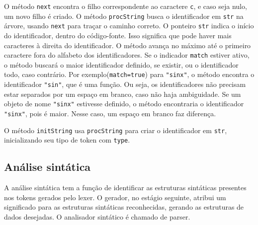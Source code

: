 O método \texttt{next} encontra o filho correspondente ao caractere \texttt{c},
e caso seja nulo, um novo filho é criado.
O método \texttt{procString} busca o identificador em \texttt{str} na árvore,
usando \texttt{next} para traçar o caminho correto.
O ponteiro \texttt{str} indica o início do identificador, dentro do código-fonte.
Isso significa que pode haver mais caracteres à direita do identificador.
O método avança no máximo até o primeiro caractere fora do alfabeto dos identificadores.
Se o indicador \texttt{match} estiver ativo, o método buscará o
maior identificador definido, se existir, ou o identificador todo, caso contrário.
Por exemplo(\texttt{match=true}) para \texttt{"sinx"},
o método encontra o identificador \texttt{"sin"}, que é uma função.
Ou seja, os identificadores não precisam estar separados por um espaço em branco,
caso não haja ambiguidade.
Se um objeto de nome \texttt{"sinx"} estivesse definido,
o método encontraria o identificador \texttt{"sinx"}, pois é maior.
Nesse caso, um espaço em branco faz diferença.

O método \texttt{initString} usa \texttt{procString}
para criar o identificador em \texttt{str},
inicializando seu tipo de token com \texttt{type}.

\subsection{Análise sintática}
A análise sintática tem a função de identificar as estruturas sintáticas
presentes nos tokens gerados pelo lexer.
O gerador, no estágio seguinte, atribui um significado para as estruturas sintáticas reconhecidas,
gerando as estruturas de dados desejadas. O analisador sintático é chamado de parser.

